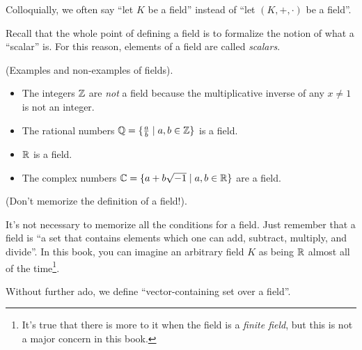 \begin{defn}
    Colloquially, we often say ``let $K$ be a field'' instead of ``let $(K, +, \cdot)$ be a field''.
    
    Recall that the whole point of defining a field is to formalize the notion of what a ``scalar'' is. For this reason, elements of a field are called \textit{scalars}.
\end{defn}

\begin{remark}
    (Examples and non-examples of fields).
    
    \begin{itemize}
        \item The integers $\mathbb{Z}$ are \textit{not} a field because the multiplicative inverse of any $x \neq 1$ is not an integer.
        \item The rational numbers $\mathbb{Q} = \{\frac{a}{b} \mid a, b \in \mathbb{Z}\}$ is a field.
        \item $\mathbb{R}$ is a field.
        \item The complex numbers $\mathbb{C} = \{ a + b\sqrt{-1} \mid a, b \in \mathbb{R}\}$ are a field.
    \end{itemize}
\end{remark}

\begin{remark}
    (Don't memorize the definition of a field!).
    
    It's not necessary to memorize all the conditions for a field. Just remember that a field is ``a set that contains elements which one can add, subtract, multiply, and divide''. In this book, you can imagine an arbitrary field $K$ as being $\mathbb{R}$ almost all of the time\footnote{It's true that there is more to it when the field is a \textit{finite field}, but this is not a major concern in this book.}.
\end{remark}

Without further ado, we define ``vector-containing set over a field''.

